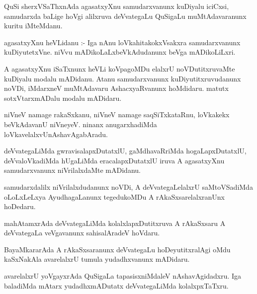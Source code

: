 \documentclass{article}
\begin{document}
\begin{mn}
QuSi sherxVSaThxnAda  agasatxyXnu  samudarxvanunx  kuDiyalu  iciCxsi,  samudarxda  
baLige  hoVgi  alilxruva  deVvategaLu  QuSigaLu  muMtAdavaranunx  kuritu  iMteMdanu.
\end{mn}

\begin{mn}
agasatxyXnu  heVLidanu :- Iga  nAnu  loVkahitakokxVsakxra  samudarxvanunx  kuDiyutetxVne.  
niVvu  mADikoLaLxbeVkAdudanunx beVga mADikoLiLxri.
\end{mn}

\begin{mn}
A  agasatxyXnu  iSaTxnunx  heVLi  koVpagoMDu elalxrU  noVDutitxruvaMte  kuDiyalu  
modalu  mADidanu.  Atanu  samudarxvanunx  kuDiyutitxruvudanunx  noVDi,  iMdarxneV  
muMtAdavaru  AshacxyaRvanunx  hoMdidaru.  matutx  sotxVtarxmADalu  modalu  mADidaru.
\end{mn}

\begin{mn}
niVneV  namage  rakaSxkanu,  niVneV  namage  saqSiTxkataRnu,  loVkakekx  beVkAdavanU  
niVneyeV.  ninanx  anugarxhadiMda  loVkavelalxvUnAshavAgabAradu.
\end{mn}

\begin{mn}
deVvategaLiMda  gwravisalapxDutatxlU,  gaMdhavaRriMda  hogaLapxDutatxlU,  
deVvaloVkadiMda  hUgaLiMda  eracalapxDutatxlU  iruva  A agasatxyXnu  
samudarxvanunx  niVrilalxdaMte  mADidanu.
\end{mn}

\begin{mn}
samudarxdalilx  niVrilalxdudanunx  noVDi,  A  deVvategaLelalxrU  saMtoVSadiMda  
oLoLxLeLxya  AyudhagaLanunx  tegedukoMDu  A  rAkaSxsarelalxranUnx  hoDedaru.
\end{mn}

\begin{mn}
mahAtamxrAda  deVvategaLiMda  kolalxlapxDutitxruva  A  rAkaSxsaru  
A  deVvategaLa  veVgavanunx  sahisalAradeV  hoVdaru.
\end{mn}

\begin{mn}
BayaMkararAda  A  rAkaSxsaranunx  deVvategaLu  hoDeyutitxralAgi  oMdu  kaSxNakAla  
avarelalxrU  tumula  yudadhxvanunx  mADidaru.
\end{mn}

\begin{mn}
avarelalxrU  yoVgayxrAda  QuSigaLa  tapasisxniMdaleV  nAshavAgidadxru.  Iga  
baladiMda  mAtarx  yudadhxmADutatx  deVvategaLiMda  kolalxpxTaTxru.
\end{mn}
\end{document}

